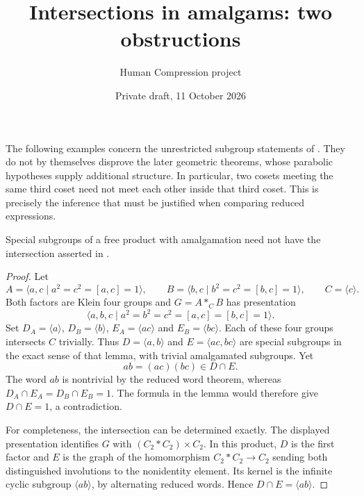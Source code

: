 
\title{Intersections in amalgams: two obstructions}
\author{Human Compression project}
\date{Private draft, 11 October 2026}

\maketitle

The following examples concern the unrestricted subgroup statements of
\cite[Lemmas 3.15(a) and 3.29(a)]{PT}. They do not by themselves disprove
the later geometric theorems, whose parabolic hypotheses supply additional
structure. In particular, two cosets meeting the same third coset need not
meet each other inside that third coset. This is precisely the inference
that must be justified when comparing reduced expressions.

\begin{proposition}\label{prop:amalgam}
Special subgroups of a free product with amalgamation need not have the
intersection asserted in \cite[Lemma 3.15(a)]{PT}.
\end{proposition}
\begin{proof}
Let
\[
 A=\langle a,c\mid a^2=c^2=[a,c]=1\rangle,\qquad
 B=\langle b,c\mid b^2=c^2=[b,c]=1\rangle,
 \qquad C=\langle c\rangle.
\]
Both factors are Klein four groups and $G=A*_C B$ has presentation
\[
 \langle a,b,c\mid a^2=b^2=c^2=[a,c]=[b,c]=1\rangle.
\]
Set $D_A=\langle a\rangle$, $D_B=\langle b\rangle$,
$E_A=\langle ac\rangle$ and $E_B=\langle bc\rangle$.
Each of these four groups intersects $C$ trivially. Thus
$D=\langle a,b\rangle$ and $E=\langle ac,bc\rangle$ are special
subgroups in the exact sense of that lemma, with trivial amalgamated
subgroups. Yet
\[
 ab=(ac)(bc)\in D\cap E.
\]
The word $ab$ is nontrivial by the reduced word theorem, whereas
$D_A\cap E_A=D_B\cap E_B=1$. The formula in the lemma would therefore
give $D\cap E=1$, a contradiction.

For completeness, the intersection can be determined exactly. The displayed
presentation identifies $G$ with $(C_2*C_2)\times C_2$. In this product,
$D$ is the first factor and $E$ is the graph of the homomorphism
$C_2*C_2\longrightarrow C_2$ sending both distinguished involutions to
the nonidentity element. Its kernel is the infinite cyclic subgroup
$\langle ab\rangle$, by alternating reduced words. Hence
$D\cap E=\langle ab\rangle$.
\end{proof}

